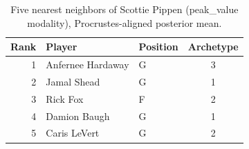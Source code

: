 \begin{table}[htbp]
  \centering\small
  \begin{tabular}{rllc}
    \toprule
    Rank & Player & Position & Archetype \\
    \midrule
    1 & Anfernee Hardaway & G & 3 \\
    2 & Jamal Shead & G & 1 \\
    3 & Rick Fox & F & 2 \\
    4 & Damion Baugh & G & 1 \\
    5 & Caris LeVert & G & 2 \\
    \bottomrule
  \end{tabular}
  \caption{Five nearest neighbors of Scottie Pippen (peak_value modality), Procrustes-aligned posterior mean.}
  \label{tab:Scottie_Pippen_neighbors_peak_value}
\end{table}

